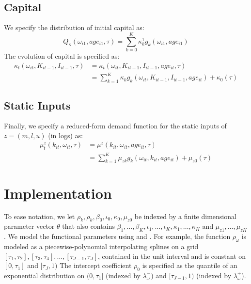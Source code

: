 \documentclass{article}
\begin{document}
\subsection{Capital}
We specify the distribution of initial capital as:
\begin{equation}\label{kinitial}
Q_{\kappa}(\omega_{i1}, age_{i1}, \tau)=\sum_{k=0}^{K}\kappa_{k}^{1}g_{k}(\omega_{i1}, age_{i1})
\end{equation}
The evolution of capital is specified as:
\begin{equation}\label{kevolution}
\begin{split}
\kappa_{t}(\omega_{it}, K_{it-1}, I_{it-1}, \tau)&=\kappa_{t}(\omega_{it}, K_{it-1}, I_{it-1}, age_{it}, \tau)\\
&=\sum_{k=1}^{K}\kappa_{k}g_{k}(\omega_{it}, K_{it-1}, I_{it-1}, age_{it})+\kappa_{0}(\tau)
\end{split}
\end{equation}

\subsection{Static Inputs}
Finally, we specify a reduced-form demand function for the static inputs of $z=(m, l, u)$ (in logs) as:
\begin{equation}\label{staticmodel}
\begin{split}
\mu_{t}^{z}(k_{it}, \omega_{it}, \tau)&=\mu^{z}(k_{it}, \omega_{it}, age_{it}, \tau)\\
&=\sum_{k=1}^{K}\mu_{zk}g_{k}(\omega_{it}, k_{it}, age_{it})+\mu_{z0}(\tau)
\end{split}
\end{equation}

\section{Implementation}
To ease notation, we let $\rho_{k}, \rho_{k}, \beta_{0}, \iota_{0}, \kappa_{0}, \mu_{z0}$ be indexed by a finite dimensional parameter vector $\theta$ that also contains $\beta_{1},\dots,\beta_{K}, \iota_{1},\dots,\iota_{K}, \kappa_{1},\dots, \kappa_{K}$ and $ \mu_{z1},\dots,\mu_{zK}$. We model the functional parameters using \cite{Wei2009} and \cite{Arellano2016}. For example, the function $\rho_{\omega}$ is modeled as a piecewise-polynomial interpolating splines on a grid $[\tau_{1},\tau_{2}], [\tau_{3},\tau_{4}],\dots, [\tau_{J-1},\tau_{J}]$, contained in the unit interval and is constant on $[0, \tau_{1}]$ and $[\tau_{J}, 1)$ The intercept coefficient $\rho_{0}$ is specified as the quantile of an exponential distribution on $(0,\tau_{1}]$ (indexed by $\lambda_{\omega}^{-}$) and $[\tau_{J-1}, 1)$ (indexed by $\lambda_{\omega}^{+}$).\\
\end{document}
